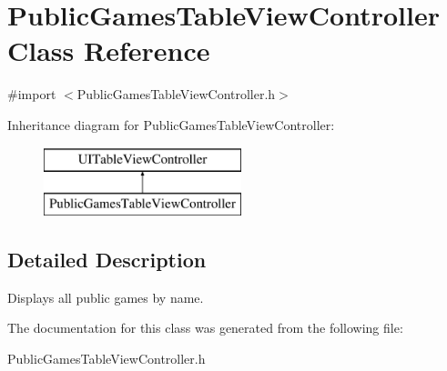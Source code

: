 \hypertarget{interface_public_games_table_view_controller}{\section{Public\+Games\+Table\+View\+Controller Class Reference}
\label{interface_public_games_table_view_controller}
}


{\ttfamily \#import $<$Public\+Games\+Table\+View\+Controller.\+h$>$}

Inheritance diagram for Public\+Games\+Table\+View\+Controller\+:\begin{figure}[H]
\begin{center}
\leavevmode
\includegraphics[height=2.000000cm]{interface_public_games_table_view_controller}
\end{center}
\end{figure}


\subsection{Detailed Description}
Displays all public games by name. 

The documentation for this class was generated from the following file\+:\begin{DoxyCompactItemize}
\item 
Public\+Games\+Table\+View\+Controller.\+h\end{DoxyCompactItemize}
